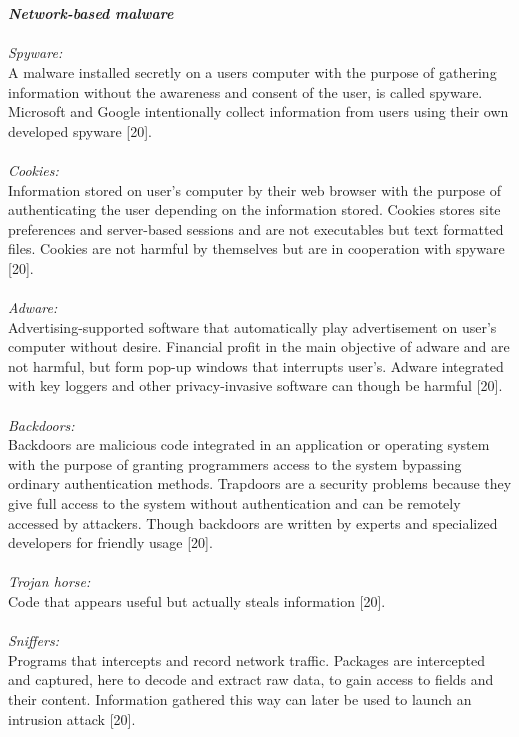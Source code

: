 \documentclass[12pt]{article} %
\begin{document}
\\ \\
\textbf{\emph{Network-based malware}}
\\ \\
\emph{Spyware:} \\
A malware installed secretly on a users computer with the purpose of gathering information without the awareness and consent of the user, is called spyware. Microsoft and Google intentionally collect information from users using their own developed spyware [20].\\ \\

\emph{Cookies:} \\
Information stored on user’s computer by their web browser with the purpose of authenticating the user depending on the information stored. Cookies stores site preferences and server-based sessions and are not executables but text formatted files. Cookies are not harmful by themselves but are in cooperation with spyware [20]. \\ \\

\emph{Adware:} \\
Advertising-supported software that automatically play advertisement on user’s computer without desire. Financial profit in the main objective of adware and are not harmful, but form pop-up windows that interrupts user’s. Adware integrated with key loggers and other privacy-invasive software can though be harmful [20]. \\ \\

\emph{Backdoors:} \\
Backdoors are malicious code integrated in an application or operating system with the purpose of granting programmers access to the system bypassing ordinary authentication methods. Trapdoors are a security problems because they give full access to the system without authentication and can be remotely accessed by attackers. Though backdoors are written by experts and specialized developers for friendly usage [20]. \\ \\

\emph{Trojan horse:} \\
Code that appears useful but actually steals information [20]. \\ \\

\emph{Sniffers:} \\
Programs that intercepts and record network traffic.  Packages are intercepted and captured, here to decode and extract raw data, to gain access to fields and their content. Information gathered this way can later be used to launch an intrusion attack [20]. \\ \\
\end{document}
